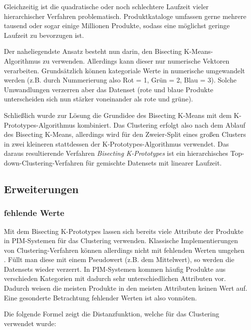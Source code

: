 Gleichzeitig ist die quadratische oder noch schlechtere Laufzeit vieler
hierarchischer Verfahren problematisch. Produktkataloge umfassen gerne
mehrere tausend oder sogar einige Millionen Produkte, sodass eine
möglichst geringe Laufzeit zu bevorzugen ist.

Der naheliegendste Ansatz besteht nun darin, den Bisecting
K-Means-Algorithmus zu verwenden. Allerdings kann dieser nur numerische
Vektoren verarbeiten. Grundsätzlich können kategoriale Werte in
numerische umgewandelt werden (z.B. durch Nummerierung also Rot = 1,
Grün = 2, Blau = 3). Solche Umwandlungen verzerren aber das Datenset
(rote und blaue Produkte unterscheiden sich nun stärker voneinander als
rote und grüne). \autocite[Kap. 1.2.6 Mixed Variables]{kaufman2009}

Schließlich wurde zur Lösung die Grundidee des Bisecting K-Means mit dem
K-Prototypes-Algorithmus kombiniert. Das Clustering erfolgt also nach
dem Ablauf des Bisecting K-Means, allerdings wird für den Zweier-Split
eines großen Clusters in zwei kleineren stattdessen der
K-Prototypes-Algorithmus verwendet. Das daraus resultierende Verfahren
\emph{Bisecting K-Prototypes} ist ein hierarchisches
Top-down-Clustering-Verfahren für gemischte Datensets mit linearer
Laufzeit.

\hypertarget{erweiterungen}{%
\subsection{Erweiterungen}\label{erweiterungen}}

\hypertarget{fehlende-werte}{%
\subsubsection{fehlende Werte}\label{fehlende-werte}}

Mit dem Bisecting K-Prototypes lassen sich bereits viele Attribute der
Produkte in PIM-Systemen für das Clustering verwenden. Klassische
Implementierungen von Clustering-Verfahren können allerdings nicht mit
fehlenden Werten umgehen \autocite[siehe z.B.][]{sklearn2022}. Füllt man
diese mit einem Pseudowert (z.B. dem Mittelwert), so werden die
Datensets wieder verzerrt. In PIM-Systemen kommen häufig Produkte aus
verschieden Kategorien mit dadurch sehr unterschiedlichen Attributen
vor. Dadurch weisen die meisten Produkte in den meisten Attributen
keinen Wert auf. Eine gesonderte Betrachtung fehlender Werten ist also
vonnöten.

Die folgende Formel zeigt die Distanzfunktion, welche für das Clustering
verwendet wurde:

